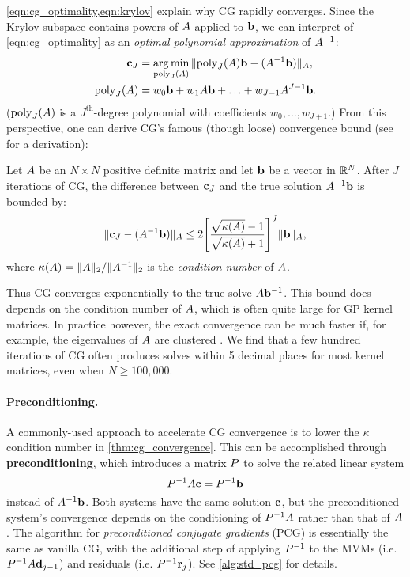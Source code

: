 \cref{eqn:cg_optimality,eqn:krylov} explain why CG rapidly converges.
Since the Krylov subspace contains powers of $A$ applied to $\mathbf{b}$, we can interpret of \cref{eqn:cg_optimality} as an \emph{optimal polynomial approximation} of $A^{-1}$:
%
\begin{align*}
  \mathbf{c}_J &= \operatorname*{arg\,min}_{\text{poly}_J(A)} \Vert \text{poly}_J(A)\mathbf{b} - (A^{-1} \mathbf{b}) \Vert_{A},
  \\
  \text{poly}_J(A) &= w_0 \mathbf{b} + w_1 A \mathbf{b} + \ldots + w_{J-1} A^{J-1} \mathbf{b}.
\end{align*}
%
($\text{poly}_J(A)$ is a $J^\text{th}$-degree polynomial with coefficients $w_0, \ldots, w_{J+1}$.)
From this perspective, one can derive CG's famous (though loose) convergence bound (see \citep{shewchuk1994introduction} for a derivation):
%
\begin{theorem}[Convergence of CG]
  \label{thm:cg_convergence}
  Let $A$ be an $N \times N$ positive definite matrix and let $\mathbf{b}$ be a vector in $\mathbb{R}^N$.
  After $J$ iterations of CG, the difference between $\mathbf{c}_J$ and the true solution $A^{-1} \mathbf{b}$ is bounded by:
  \begin{equation*}
    \Vert \mathbf{c}_J - (A^{-1} \mathbf{b}) \Vert_{A}
    \leq
    2 \Bigg[ \frac{ \sqrt{ \kappa(A) } - 1 }{\sqrt{ \kappa(A) } + 1} \Biggr]^J \Vert \mathbf{b} \Vert_{A},
  \end{equation*}
  where $\kappa(A) = \Vert A \Vert_2 / \Vert A^{-1} \Vert_2$ is the \emph{condition number} of $A$.
\end{theorem}
%
Thus CG converges exponentially to the true solve $A \mathbf{b}^{-1}$.
This bound does depends on the condition number of $A$, which is often quite large for GP kernel matrices.
In practice however, the exact convergence can be much faster if, for example, the eigenvalues of $A$ are clustered \cite{saad2003iterative}.
We find that a few hundred iterations of CG often produces solves within 5 decimal places for most kernel matrices, even when $N \geq 100,\!000$.

\paragraph{Preconditioning.}
A commonly-used approach to accelerate CG convergence is to lower the $\kappa$ condition number in \cref{thm:cg_convergence}.
This can be accomplished through {\bf preconditioning}, which introduces a matrix $P$ to solve the related linear system
%
\[
  P^{-1} A \mathbf{c} = P^{-1} \mathbf{b}
\]
%
instead of $A^{-1} \mathbf{b}$.
Both systems have the same solution $\mathbf{c}$, but the preconditioned system's convergence depends on the conditioning of $P^{-1} A$ rather than that of $A$.
The algorithm for \emph{preconditioned conjugate gradients} (PCG) is essentially the same as vanilla CG, with the additional step of applying $P^{-1}$ to the MVMs (i.e. $P^{-1} A \mathbf{d}_{j-1}$) and residuals (i.e. $P^{-1} \mathbf{r}_j$).
See \cref{alg:std_pcg} for details.

